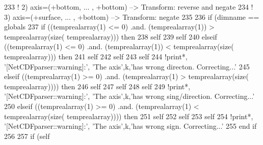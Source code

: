 \begin{DoxyCode}
233                         \textcolor{comment}{! 2)  axis=(+bottom, ... , +bottom)  --> Transform: reverse and negate}
234                         \textcolor{comment}{! 3)  axis=(+surface, ... , +bottom)  --> Transform: negate}
235 
236                         \textcolor{keywordflow}{if} (dimname == globals%
237                             \textcolor{keywordflow}{if} ((temprealarray(1) <= 0) .and. (temprealarray(1)) > temprealarray(\textcolor{keyword}{size}(
      temprealarray))) \textcolor{keywordflow}{then}
238                                 self%
239                                 self%
240                             \textcolor{keywordflow}{elseif} ((temprealarray(1) <= 0) .and. (temprealarray(1)) < temprealarray(\textcolor{keyword}{size}(
      temprealarray))) \textcolor{keywordflow}{then}
241                                 self%
242                                 self%
243                                 self%
244                                 \textcolor{comment}{!print*, '[NetCDFparser::warning]:', 'The axis',k,'has wrong directon.
       Correcting...'}
245                             \textcolor{keywordflow}{elseif} ((temprealarray(1) >= 0) .and. (temprealarray(1) > temprealarray(\textcolor{keyword}{size}(
      temprealarray)))) \textcolor{keywordflow}{then}
246                                 self%
247                                 self%
248                                 self%
249                                 \textcolor{comment}{!print*, '[NetCDFparser::warning]:', 'The axis',k,'has wrong
       sing/direction. Correcting...'}
250                             \textcolor{keywordflow}{elseif} ((temprealarray(1) >= 0) .and. (temprealarray(1) < temprealarray(\textcolor{keyword}{size}(
      temprealarray)))) \textcolor{keywordflow}{then}
251                                 self%
252                                 self%
253                                 self%
254                                 \textcolor{comment}{!print*, '[NetCDFparser::warning]:', 'The axis',k,'has wrong sign.
       Correcting...'}
255 \textcolor{keywordflow}{                            end if}
256 
257                             \textcolor{keywordflow}{if} (self%

\end{DoxyCode}
